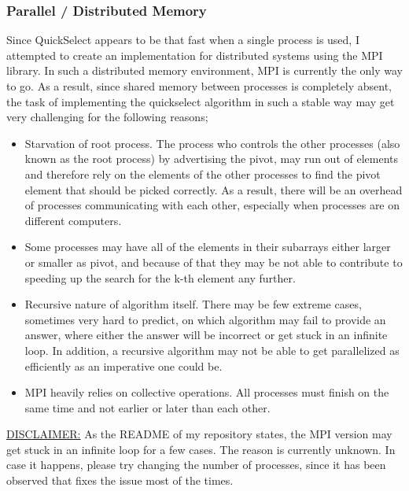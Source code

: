 \documentclass[11pt]{article}
\begin{document}
\subsubsection{Parallel / Distributed Memory}
\label{sec:orgdc3a1f2}
Since QuickSelect appears to be that fast when a single process is used, I attempted to create an implementation for distributed systems using the MPI library. In such a distributed memory environment, MPI is currently the only way to go. As a result, since shared memory between processes is completely absent, the task of implementing the quickselect algorithm in such a stable way may get very challenging for the following reasons;
\begin{itemize}
\item Starvation of root process. The process who controls the other processes (also known as the root process) by advertising the pivot, may run out of elements and therefore rely on the elements of the other processes to find the pivot element that should be picked correctly. As a result, there will be an overhead of processes communicating with each other, especially when processes are on different computers.
\item Some processes may have all of the elements in their subarrays either larger or smaller as pivot, and because of that they may be not able to contribute to speeding up the search for the k-th element any further.
\item Recursive nature of algorithm itself. There may be few extreme cases, sometimes very hard to predict, on which algorithm may fail to provide an answer, where either the answer will be incorrect or get stuck in an infinite loop. In addition, a recursive algorithm may not be able to get parallelized as efficiently as an imperative one could be.
\item MPI heavily relies on collective operations. All processes must finish on the same time and not earlier or later than each other. \autocite{mpi-forum}
\end{itemize}
\uline{DISCLAIMER:} As the README of my repository states, the MPI version may get stuck in an infinite loop for a few cases. The reason is currently unknown. In case it happens, please try changing the number of processes, since it has been observed that fixes the issue most of the times.
\end{document}
